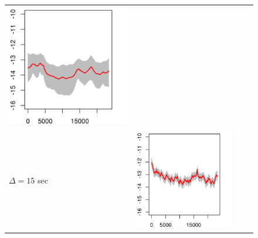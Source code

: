 \documentclass[10pt]{article}
\begin{document}
\begin{figure}
\begin{tabular}{m{0.25cm}ccc}
\begin{minipage}{0.25\textwidth}
				\includegraphics[width=1\linewidth]{results-real-data-plots-VOL-PATHS-microstructure-VOL-PATHS-XI-Inf-dt-3e05-SDs-0.png}
				\end{minipage}  \\
%
		\begin{sideways} $\Delta = 15$ sec \end{sideways}
			& \begin{minipage}{0.25\textwidth}
				\centering
				\includegraphics[width=1\linewidth]{results-real-data-plots-VOL-PATHS-microstructure-VOL-PATHS-XI-0-dt-15000-SDs-0.png}

\end{minipage}
\end{tabular}
\end{figure}
\end{document}
